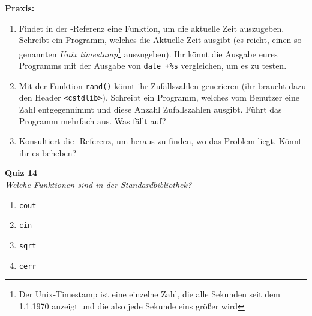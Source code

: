 \textbf{Praxis:}
\begin{enumerate}
	\item Findet in der \Cpp-Referenz eine Funktion, um die aktuelle Zeit
		auszugeben. Schreibt ein Programm, welches die Aktuelle Zeit ausgibt
		(es reicht, einen so genannten \emph{Unix timestamp}\footnote{Der
		Unix-Timestamp ist eine einzelne Zahl, die alle Sekunden seit dem
	1.1.1970 anzeigt und die also jede Sekunde eins größer wird} auszugeben).
	Ihr könnt die Ausgabe eures Programms mit der Ausgabe von \texttt{date
		+\%s} vergleichen, um es zu testen.
    \item Mit der Funktion \texttt{rand()} könnt ihr Zufallszahlen generieren
        (ihr braucht dazu den Header \texttt{<cstdlib>}). Schreibt ein
        Programm, welches vom Benutzer eine Zahl entgegennimmt und diese Anzahl
        Zufallszahlen ausgibt. Führt das Programm mehrfach aus. Was fällt auf?
    \item Konsultiert die \Cpp-Referenz, um heraus zu finden, wo das Problem
        liegt. Könnt ihr es beheben?
\end{enumerate}

\newpage

\textbf{Quiz 14}\\
\textit{Welche Funktionen sind in der Standardbibliothek?}
\begin{enumerate}[label=\alph*)]
    \item \texttt{cout}
    \item \texttt{cin}
    \item \texttt{sqrt}
    \item \texttt{cerr}
\end{enumerate}
